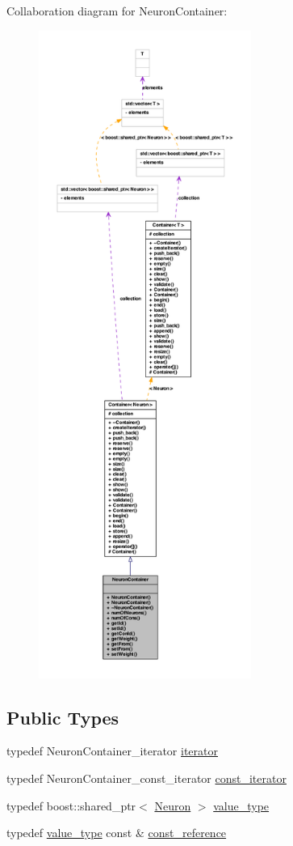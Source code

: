 Collaboration diagram for NeuronContainer:\nopagebreak
\begin{figure}[H]
\begin{center}
\leavevmode
\includegraphics[height=600pt]{class_neuron_container__coll__graph}
\end{center}
\end{figure}
\subsection*{Public Types}
\begin{DoxyCompactItemize}
\item 
typedef NeuronContainer\_\-iterator \hyperlink{class_neuron_container_abf81356adaea3bfc64aa03777e9a8def}{iterator}
\item 
typedef NeuronContainer\_\-const\_\-iterator \hyperlink{class_neuron_container_a41749602f05e7610da7f0f1fd59f5442}{const\_\-iterator}
\item 
typedef boost::shared\_\-ptr$<$ \hyperlink{class_neuron}{Neuron} $>$ \hyperlink{class_neuron_container_ac067345f1d27a5b04e4d9487b319ccaa}{value\_\-type}
\item 
typedef \hyperlink{class_neuron_container_ac067345f1d27a5b04e4d9487b319ccaa}{value\_\-type} const \& \hyperlink{class_neuron_container_a468ffbb00b15553f73da46dd62c91c8d}{const\_\-reference}
\end{DoxyCompactItemize}
